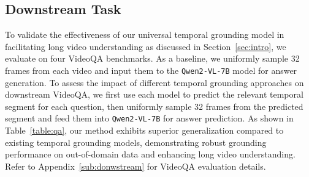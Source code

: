 \begin{table}[b]
\vspace{-20pt}
\caption{
\textbf{Performance on VideoQA benchmarks.}
R@IoU is the mean Recall@1 at IoU thresholds $[0.1:0.1:0.5]$. For grounded VideoQA, IoP and mIoU are used as grounding metrics.}
\vspace{5pt}
\centering
{}
\label{table:qa}
\end{table}


\vspace{-5pt}
\subsection{Downstream Task}
\label{subsec:down}
\vspace{-5pt}
To validate the effectiveness of our universal temporal grounding model in facilitating long video understanding as discussed in Section~\ref{sec:intro}, we evaluate on four VideoQA benchmarks.
As a baseline, we uniformly sample 32 frames from each video and input them to the \texttt{Qwen2-VL-7B} model for answer generation.
To assess the impact of different temporal grounding approaches on downstream VideoQA, we first use each model to predict the relevant temporal segment for each question, then uniformly sample 32 frames from the predicted segment and feed them into \texttt{Qwen2-VL-7B} for answer prediction.
As shown in Table~\ref{table:qa}, our method exhibits superior generalization compared to existing temporal grounding models, demonstrating robust grounding performance on out-of-domain data and enhancing long video understanding. Refer to Appendix~\ref{sub:donwstream} for VideoQA evaluation details.
